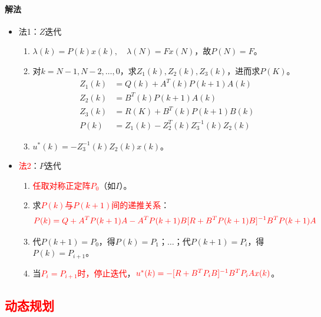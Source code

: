 \documentclass[
12pt, %
a4paper, 
oneside, %
]{scrartcl}
\begin{document}
\paragraph{解法}
\begin{itemize}
\item 法1：$ Z $迭代
\begin{enumerate}
\item $ \lambda(k) = P(k) x(k), \quad \lambda(N) = F x(N)  $，故$ P(N) = F $。
\item 对$ k = N - 1, N - 2, \dots, 0 $，求$ Z_1(k), Z_2(k), Z_3(k) $，进而求$ P(K) $。
\begin{align*} Z_1(k) &= Q(k) + A^T(k) P(k + 1) A(k) \\ Z_2(k) &= B^T(k) P(k + 1) A(k) \\ Z_3(k) &= R(K) + B^T(k) P(k + 1) B(k) \\ P(k) &= Z_1(k) - Z_2^T(k) Z_3^{-1}(k) Z_2(k) \end{align*}
\item $ u^*(k) = -Z_3^{-1}(k) Z_2(k) x(k) $。
\end{enumerate}
\item \textcolor{red}{法2}：$ P $迭代
\begin{enumerate}
\item \textcolor{red}{任取对称正定阵$ P_0 $}（如$ I $）。
\item 求\textcolor{red}{$ P(k) $与$ P(k + 1) $间的递推关系}：
$$ \textcolor{red}{P(k) = Q + A^T P(k + 1) A - A^T P(k + 1) B [R + B^T P(k + 1) B]^{-1} B^T P(k + 1) A} $$
\item 代$ P(k + 1) = P_0 $，得$ P(k) = P_1 $；$ \dots $；代$ P(k + 1) = P_i $，得$ P(k) = P_{i + 1} $。
\item 当\textcolor{red}{$ P_i = P_{i + 1} $时，停止迭代}，$ \textcolor{red}{u^*(k) = -[R + B^T P_i B]^{-1} B^T P_i A x(k)} $。
\end{enumerate}
\end{itemize}
\subsection[动态规划]{\textcolor{red}{动态规划}}
\end{document}
